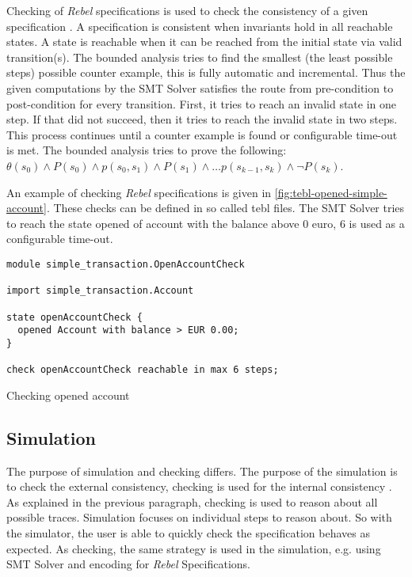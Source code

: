 Checking of \textit{Rebel} specifications is used to check the consistency of a given specification \cite[p.5]{stoel_storm_vinju_bosman_2016}. A specification is consistent when invariants hold in all reachable states. A state is reachable when it can be reached from the initial state via valid transition(s).
The bounded analysis tries to find the smallest (the least possible steps) possible counter example, this is fully automatic and incremental. Thus the given computations by the SMT Solver satisfies the route from pre-condition to post-condition for every transition.
First, it tries to reach an invalid state in one step. If that did not succeed, then it tries to reach the invalid state in two steps. This process continues until a counter example is found or configurable time-out is met. The bounded analysis tries to prove the following: $\theta (s_{0}) \land P(s_{0}) \land p(s_{0}, s_{1}) \land P(s_{1}) \land \dots p(s_{k-1}, s_{k}) \land \neg P(s_{k})$.

An example of checking \textit{Rebel} specifications is given in \autoref{fig:tebl-opened-simple-account}. These checks can be defined in so called tebl files. The SMT Solver tries to reach the state opened of account with the balance above 0 euro, 6 is used as a configurable time-out.

\begin{sourcecode}[h]
\begin{lstlisting}[]
module simple_transaction.OpenAccountCheck

import simple_transaction.Account

state openAccountCheck {
  opened Account with balance > EUR 0.00;
}

check openAccountCheck reachable in max 6 steps;
\end{lstlisting}
\caption{Checking opened account}
\label{fig:tebl-opened-simple-account}
\end{sourcecode}


\subsection{Simulation}
The purpose of simulation and checking differs. The purpose of the simulation is to check the external consistency, checking is used for the internal consistency \cite[p.5]{stoel_storm_vinju_bosman_2016}. As explained in the previous paragraph, checking is used to reason about all possible traces. Simulation focuses on individual steps to reason about. So with the simulator, the user is able to quickly check the specification behaves as expected. As checking, the same strategy is used in the simulation, e.g. using SMT Solver and encoding for \textit{Rebel} Specifications.
